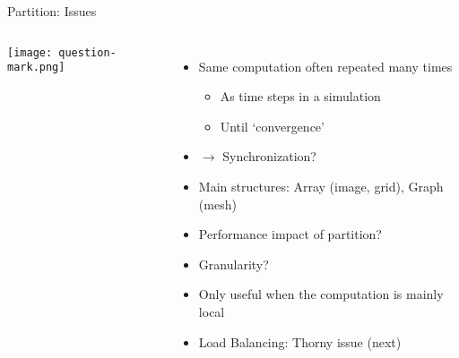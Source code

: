\documentclass[english,compress]{beamer}
\begin{document}
\begin{frame}{Partition: Issues}
  \begin{columns}
      \texttt{[image: question-mark.png]}
      \begin{itemize}
        \item Same computation often repeated many times
          \begin{itemize}
            \item As time steps in a simulation
            \item Until `convergence'
          \end{itemize}
        \item $\to$ Synchronization?
        \item Main structures: Array (image, grid), Graph (mesh)
        \item Performance impact of partition?
        \item Granularity?
        \item Only useful when the computation is mainly local
        \item Load Balancing: Thorny issue (next)
      \end{itemize}
  \end{columns}
\end{frame}
\end{document}
